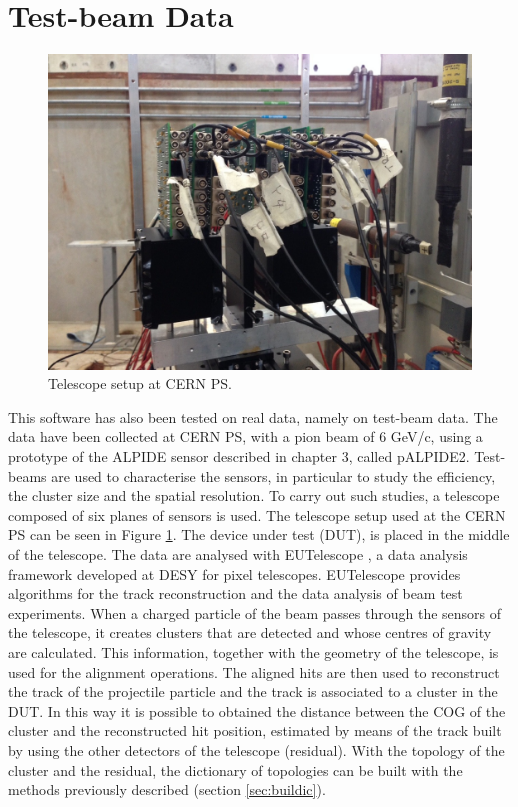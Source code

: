 \section{Test-beam Data}
%
\begin{figure}
  \centering
  \includegraphics[scale=0.22]{figures/telescope.png}
  \caption{Telescope setup at CERN PS.}
  \label{fig:telescope}
\end{figure}
%
This software has also been tested on real data, namely on test-beam data. The data have been collected at CERN PS, with a pion beam of 6 GeV/c, using a prototype of the ALPIDE sensor described in chapter 3, called pALPIDE2. Test-beams are used to characterise the sensors, in particular to study the efficiency, the cluster size and the spatial resolution. To carry out such studies, a telescope composed of six planes of sensors is used. The telescope setup used at the CERN PS can be seen in Figure \ref{fig:telescope}. The device under test (DUT), is placed in the middle of the telescope. The data are analysed with EUTelescope \cite{eutelescope}, a data analysis framework developed at DESY for pixel telescopes. EUTelescope provides algorithms for the track reconstruction and the data analysis of beam test experiments. When a charged particle of the beam passes through the sensors of the telescope, it creates clusters that are detected and whose centres of gravity are calculated. This information, together with the geometry of the telescope, is used for the alignment operations. The aligned hits are then used to reconstruct the track of the projectile particle and the track is associated to a cluster in the DUT. In this way it is possible to obtained the distance between the COG of the cluster and the reconstructed hit position, estimated by means of the track built by using the other detectors of the telescope (residual). With the topology of the cluster and the residual, the dictionary of topologies can be built with the methods previously described (section \ref{sec:buildic}).\\
